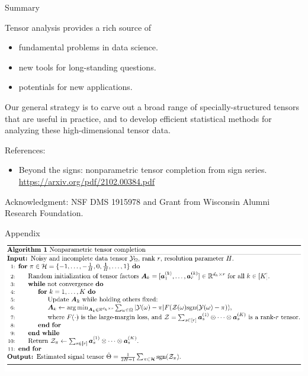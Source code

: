 \documentclass[10pt, mathserif]{beamer} %
\theoremstyle{definition}
\theoremstyle{plain}
\begin{document}
\begin{frame}{Summary}

Tensor analysis provides a rich source of
\begin{itemize}
\item fundamental problems in data science.
\item new tools for long-standing questions.
\item potentials for new applications.
\end{itemize}

\begin{block}{}
Our general strategy is to carve out a broad range of {\color{red}specially-structured tensors} that are useful in practice, and to develop efficient statistical methods for analyzing these high-dimensional tensor data.
\end{block}

References:
\begin{itemize}
\item {\color{blue}Beyond the signs: nonparametric tensor completion from sign series. \url{https://arxiv.org/pdf/2102.00384.pdf}}
\end{itemize}
\vspace{.2cm}
Acknowledgment: {\small NSF DMS 1915978 and Grant from Wisconsin Alumni Research Foundation.}
\end{frame}



\appendix
\begin{frame}{Appendix}
    \includegraphics[width = \textwidth]{Figures/algorithm.pdf}
\end{frame}
\end{document}
